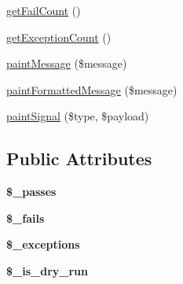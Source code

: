 \begin{DoxyCompactItemize}
\item 
\hyperlink{class_simple_scorer_aecb332848ece06f516351ad030c817d7}{getFailCount} ()
\item 
\hyperlink{class_simple_scorer_a85d6400743d679e59d2a276ce8be05ac}{getExceptionCount} ()
\item 
\hyperlink{class_simple_scorer_a7f36f3898644df27fa84eb506ae706ca}{paintMessage} (\$message)
\item 
\hyperlink{class_simple_scorer_a19d5b72bd448cc22636569e20b64f607}{paintFormattedMessage} (\$message)
\item 
\hyperlink{class_simple_scorer_a968ed699077b65e8a55e2a86fabe5589}{paintSignal} (\$type, \$payload)
\end{DoxyCompactItemize}
\subsection*{Public Attributes}
\begin{DoxyCompactItemize}
\item 
\hypertarget{class_simple_scorer_ab7c6371da98993a66657ad9800fa226c}{
{\bfseries \$\_\-passes}}
\label{class_simple_scorer_ab7c6371da98993a66657ad9800fa226c}

\item 
\hypertarget{class_simple_scorer_a509d0b3f6d84b9412967a23e783eb3b8}{
{\bfseries \$\_\-fails}}
\label{class_simple_scorer_a509d0b3f6d84b9412967a23e783eb3b8}

\item 
\hypertarget{class_simple_scorer_aeca829bc77cb3b4ecc3c88079accff61}{
{\bfseries \$\_\-exceptions}}
\label{class_simple_scorer_aeca829bc77cb3b4ecc3c88079accff61}

\item 
\hypertarget{class_simple_scorer_ad9ec736efcedfd80b3d32c33517b5e6c}{
{\bfseries \$\_\-is\_\-dry\_\-run}}
\label{class_simple_scorer_ad9ec736efcedfd80b3d32c33517b5e6c}

\end{DoxyCompactItemize}



